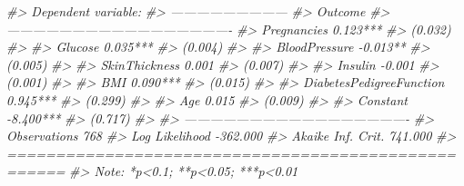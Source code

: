 \documentclass[]{book}
\newenvironment{Shaded}{\begin{snugshade}}{\end{snugshade}}
\newcommand{\CommentTok}[1]{\textcolor[rgb]{0.56,0.35,0.01}{\textit{#1}}}
\begin{document}
\begin{Shaded}
\begin{Highlighting}[]
\CommentTok{#>                              Dependent variable:    }
\CommentTok{#>                          ---------------------------}
\CommentTok{#>                                    Outcome          }
\CommentTok{#> ----------------------------------------------------}
\CommentTok{#> Pregnancies                       0.123***          }
\CommentTok{#>                                    (0.032)          }
\CommentTok{#>                                                     }
\CommentTok{#> Glucose                           0.035***          }
\CommentTok{#>                                    (0.004)          }
\CommentTok{#>                                                     }
\CommentTok{#> BloodPressure                     -0.013**          }
\CommentTok{#>                                    (0.005)          }
\CommentTok{#>                                                     }
\CommentTok{#> SkinThickness                       0.001           }
\CommentTok{#>                                    (0.007)          }
\CommentTok{#>                                                     }
\CommentTok{#> Insulin                            -0.001           }
\CommentTok{#>                                    (0.001)          }
\CommentTok{#>                                                     }
\CommentTok{#> BMI                               0.090***          }
\CommentTok{#>                                    (0.015)          }
\CommentTok{#>                                                     }
\CommentTok{#> DiabetesPedigreeFunction          0.945***          }
\CommentTok{#>                                    (0.299)          }
\CommentTok{#>                                                     }
\CommentTok{#> Age                                 0.015           }
\CommentTok{#>                                    (0.009)          }
\CommentTok{#>                                                     }
\CommentTok{#> Constant                          -8.400***         }
\CommentTok{#>                                    (0.717)          }
\CommentTok{#>                                                     }
\CommentTok{#> ----------------------------------------------------}
\CommentTok{#> Observations                         768            }
\CommentTok{#> Log Likelihood                    -362.000          }
\CommentTok{#> Akaike Inf. Crit.                  741.000          }
\CommentTok{#> ====================================================}
\CommentTok{#> Note:                    *p<0.1; **p<0.05; ***p<0.01}
\end{Highlighting}
\end{Shaded}
\end{document}

